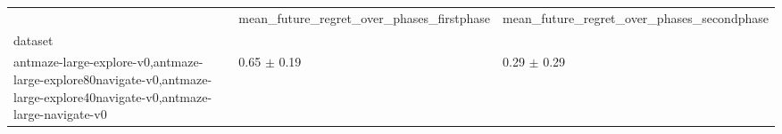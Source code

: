 \begin{tabular}{lll}
\toprule
 & mean_future_regret_over_phases_firstphase & mean_future_regret_over_phases_secondphase \\
dataset &  &  \\
\midrule
antmaze-large-explore-v0,antmaze-large-explore80navigate-v0,antmaze-large-explore40navigate-v0,antmaze-large-navigate-v0 & 0.65 $\pm$ 0.19 & 0.29 $\pm$ 0.29 \\
\bottomrule
\end{tabular}

